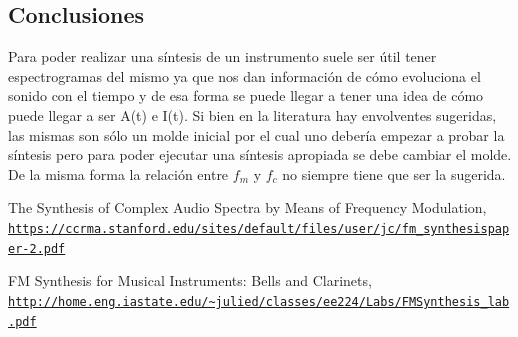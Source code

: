 \documentclass[assd_tp2_main.tex]{subfiles}
\begin{document}
\subsection{Conclusiones}
Para poder realizar una síntesis de un instrumento suele ser útil tener espectrogramas del mismo ya que nos dan información de cómo evoluciona el sonido con el tiempo y de esa forma se puede llegar a tener una idea de cómo puede llegar a ser A(t) e I(t). Si bien en la literatura hay envolventes sugeridas, las mismas son sólo un molde inicial por el cual uno debería empezar a probar la síntesis pero para poder ejecutar una síntesis apropiada se debe cambiar el molde. De la misma forma la relación entre $f_m$ y $f_c$ no siempre tiene que ser la sugerida. 
\begin{thebibliography}{9}
  
The Synthesis of Complex Audio Spectra by Means of Frequency Modulation,
\\\texttt{\url{https://ccrma.stanford.edu/sites/default/files/user/jc/fm_synthesispaper-2.pdf}}

FM Synthesis for Musical Instruments: Bells and Clarinets,
\\\texttt{\url{http://home.eng.iastate.edu/~julied/classes/ee224/Labs/FMSynthesis_lab.pdf}}


\end{thebibliography}
\end{document}
